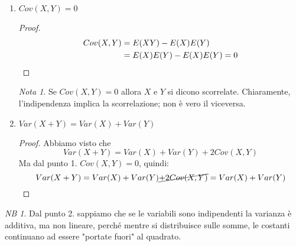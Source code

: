 \documentclass{article}
\theoremstyle{plain}
\theoremstyle{definition}
\theoremstyle{remark}
\newtheorem*{nota}{Nota}
\newtheorem*{NB}{NB}
\begin{document}
\begin{enumerate}
	\item $Cov(X,Y)=0$
	\begin{proof}
		\begin{align*}
			Cov(X,Y)&=E(XY)-E(X)E(Y)\\
			&=E(X)E(Y)-E(X)E(Y)=0\qedhere
		\end{align*}
	\end{proof}
	\begin{nota}
		Se $Cov(X,Y)=0$ allora $X$ e $Y$ si dicono scorrelate. Chiaramente, l'indipendenza implica la scorrelazione; non è vero il viceversa.
	\end{nota}
	\item $Var(X+Y)=Var(X)+Var(Y)$
	\begin{proof}
		Abbiamo visto che
		\begin{equation*}
			Var(X+Y)=Var(X)+Var(Y)+2Cov(X,Y)
		\end{equation*}
		Ma dal punto 1. $Cov(X,Y)=0$, quindi:
		\begin{equation*}
			Var(X+Y)=Var(X)+Var(Y)\cancel{+2Cov(X,Y)}=Var(X)+Var(Y)\qedhere
		\end{equation*}
	\end{proof}
\end{enumerate}
\begin{NB}
	Dal punto 2. sappiamo che se le variabili sono indipendenti la varianza è additiva, ma non lineare, perché mentre si distribuisce sulle somme, le costanti continuano ad essere "portate fuori" al quadrato.
\end{NB}
\end{document}
